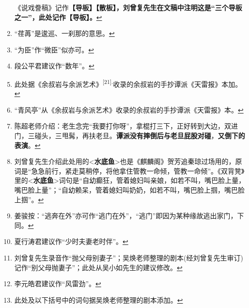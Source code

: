 \begin{enumerate}
  \leavevmode\hypertarget{fn478}{}%
  《说戏誊稿》记作\textbf{【导板】【散板】，刘曾复先生在文稿中注明这是``三个导板之一''，此处记作【导板】。}\protect\hyperlink{fnref478}{↩}
\item
  \leavevmode\hypertarget{fn479}{}%
  ``荏苒''是逡巡、一刹那的意思。\protect\hyperlink{fnref479}{↩}
\item
  \leavevmode\hypertarget{fn480}{}%
  ``为臣''作``微臣''似亦可。\protect\hyperlink{fnref480}{↩}
\item
  \leavevmode\hypertarget{fn481}{}%
  段公平君建议作``数年''。\protect\hyperlink{fnref481}{↩}
\item
  \leavevmode\hypertarget{fn482}{}%
  此处据《余叔岩与余派艺术》\textsuperscript{{[}21{]}.}收录的余叔岩的手抄谭派《天雷报》本加。\protect\hyperlink{fnref482}{↩}
\item
  \leavevmode\hypertarget{fn483}{}%
  ``青风亭''从《余叔岩与余派艺术》收录的余叔岩的手抄谭派《天雷报》本。\protect\hyperlink{fnref483}{↩}
\item
  \leavevmode\hypertarget{fn484}{}%
  陈超老师介绍：老生念完``我要打你呀''，拿棍打三下，正好转到大边，双进门，三碰头，三甩髯，再扶老旦。\textbf{谭派没有摔倒后与老旦屁股对碰}，\textbf{又倒下的表演}。\protect\hyperlink{fnref484}{↩}
\item
  \leavevmode\hypertarget{fn485}{}%
  刘曾复先生介绍此处用的\textless{}\textbf{水底鱼}\textgreater{}也是《麒麟阁》贺芳追秦琼过场用的，原词是``急急前行，紧走莫稍停，将他拿住管教一命倾，管教一命倾''。《双背凳》里的\textless{}\textbf{水底鱼}\textgreater{}词句是``自幼癫狂，管着媳妇叫亲娘，如若不叫，嘴巴脸上量，嘴巴脸上量''；``自幼赖呆，管着媳妇叫奶奶，如若不叫，嘴巴脸上掴，嘴巴脸上掴''。\protect\hyperlink{fnref485}{↩}
\item
  \leavevmode\hypertarget{fn486}{}%
  姜骏按：``逃奔在外''亦可作``逃门在外''，``逃门''即因为某种缘故逃出家门，下同。\protect\hyperlink{fnref486}{↩}
\item
  \leavevmode\hypertarget{fn487}{}%
  夏行涛君建议作``少时夫妻老时伴''。\protect\hyperlink{fnref487}{↩}
\item
  \leavevmode\hypertarget{fn488}{}%
  刘曾复先生录音作``抛父母别妻子''；吴焕老师整理的剧本(经刘曾复先生审订)记作``别父母抛妻子''；此处从吴小如先生的建议修改。\protect\hyperlink{fnref488}{↩}
\item
  \leavevmode\hypertarget{fn489}{}%
  李元皓君建议作``风雷劲''。\protect\hyperlink{fnref489}{↩}
\item
  \leavevmode\hypertarget{fn490}{}%
  此处及以下括号中的词句据吴焕老师整理的剧本添加。\protect\hyperlink{fnref490}{↩}

\end{enumerate}
